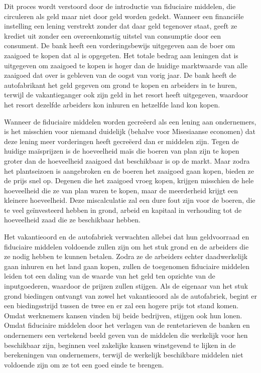 \documentclass[
  a5paper,
  smalldemyvopaper,11pt,twoside,onecolumn,openright,extrafontsizes,
hidelinks]{memoir}
\begin{document}
Dit proces wordt verstoord door de introductie van fiduciaire middelen,
die circuleren als geld maar niet door geld worden gedekt. Wanneer een
financiële instelling een lening verstrekt zonder dat daar geld
tegenover staat, geeft ze krediet uit zonder een overeenkomstig uitstel
van consumptie door een consument. De bank heeft een vorderingsbewijs
uitgegeven aan de boer om zaaigoed te kopen dat al is opgegeten. Het
totale bedrag aan leningen dat is uitgegeven om zaaigoed te kopen is
hoger dan de huidige marktwaarde van alle zaaigoed dat over is gebleven
van de oogst van vorig jaar. De bank heeft de autofabrikant het geld
gegeven om grond te kopen en arbeiders in te huren, terwijl de
vakantieganger ook zijn geld in het resort heeft uitgegeven, waardoor
het resort dezelfde arbeiders kon inhuren en hetzelfde land kon kopen.

Wanneer de fiduciaire middelen worden gecreëerd als een lening aan
ondernemers, is het misschien voor niemand duidelijk (behalve voor
Misesiaanse economen) dat deze lening meer vorderingen heeft gecreëerd
dan er middelen zijn. Tegen de huidige maïsprijzen is de hoeveelheid
maïs die boeren van plan zijn te kopen groter dan de hoeveelheid
zaaigoed dat beschikbaar is op de markt. Maar zodra het plantseizoen is
aangebroken en de boeren het zaaigoed gaan kopen, bieden ze de prijs
snel op. Degenen die het zaaigoed vroeg kopen, krijgen misschien de hele
hoeveelheid die ze van plan waren te kopen, maar de meerderheid krijgt
een kleinere hoeveelheid. Deze miscalculatie zal een dure fout zijn voor
de boeren, die te veel geïnvesteerd hebben in grond, arbeid en kapitaal
in verhouding tot de hoeveelheid zaad die ze beschikbaar hebben.

Het vakantieoord en de autofabriek verwachten allebei dat hun
geldvoorraad en fiduciaire middelen voldoende zullen zijn om het stuk
grond en de arbeiders die ze nodig hebben te kunnen betalen. Zodra ze de
arbeiders echter daadwerkelijk gaan inhuren en het land gaan kopen,
zullen de toegenomen fiduciaire middelen leiden tot een daling van de
waarde van het geld ten opzichte van de inputgoederen, waardoor de
prijzen zullen stijgen. Als de eigenaar van het stuk grond biedingen
ontvangt van zowel het vakantieoord als de autofabriek, begint er een
biedingsstrijd tussen de twee en er zal een hogere prijs tot stand
komen. Omdat werknemers kansen vinden bij beide bedrijven, stijgen ook
hun lonen. Omdat fiduciaire middelen door het verlagen van de
rentetarieven de banken en ondernemers een vertekend beeld geven van de
middelen die werkelijk voor hen beschikbaar zijn, beginnen veel
zakelijke kansen winstgevend te lijken in de berekeningen van
ondernemers, terwijl de werkelijk beschikbare middelen niet voldoende
zijn om ze tot een goed einde te brengen.
\end{document}

